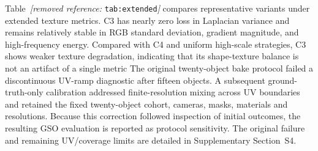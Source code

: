\documentclass[times,twocolumn,final]{elsarticle}
\providecommand{\DIFadd}[1]{{\protect\color{blue} \sf #1}} %
\providecommand{\DIFdel}[1]{{\protect\color{red} \scriptsize #1}} %
\providecommand{\DIFaddbegin}{} %
\providecommand{\DIFaddend}{} %
\providecommand{\DIFdelbegin}{} %
\providecommand{\DIFdelend}{} %
\begin{document}
\DIFdelbegin %

\DIFdel{Table~\textit{[removed reference: }\texttt{tab:extended}\textit{]} compares representative variants under extended texture metrics. C3 has nearly zero loss in Laplacian variance and remains relatively stable in RGB standard deviation, gradient magnitude, and high-frequency energy. Compared with C4 and uniform high-scale strategies, C3 shows weaker texture degradation, indicating that its shape-texture balance is not an artifact of a single metric}\DIFdelend \DIFaddbegin \DIFadd{The original twenty-object bake protocol failed a discontinuous UV-ramp diagnostic after fifteen objects. A subsequent ground-truth-only calibration addressed finite-resolution mixing across UV boundaries and retained the fixed twenty-object cohort, cameras, masks, materials and resolutions. Because this correction followed inspection of initial outcomes, the resulting GSO evaluation is reported as protocol sensitivity. The original failure and remaining UV/coverage limits are detailed in Supplementary Section~S4}\DIFaddend .

\DIFdelbegin %
\end{document}
